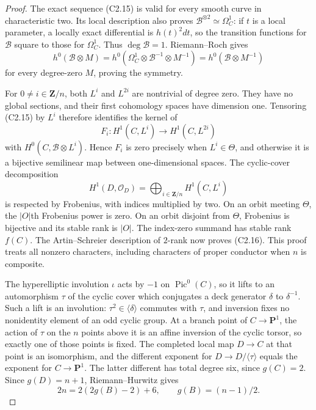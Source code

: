 \begin{proof}
The exact sequence (C2.15) is valid for every smooth curve in
characteristic two. Its local description also proves
$\mathcal B^{\otimes2}\simeq\Omega_C^1$: if $t$ is a local
parameter, a locally exact differential is $h(t)^2dt$, so the
transition functions for $\mathcal B$ square to those for
$\Omega_C^1$. Thus $\deg\mathcal B=1$. Riemann--Roch gives
\[
 h^0(\mathcal B\otimes M)
   =h^0(\Omega_C^1\otimes\mathcal B^{-1}\otimes M^{-1})
   =h^0(\mathcal B\otimes M^{-1})
\]
for every degree-zero $M$, proving the symmetry.

For $0\ne i\in\mathbf Z/n$, both $L^i$ and $L^{2i}$ are
nontrivial of degree zero. They have no global sections, and
their first cohomology spaces have dimension one. Tensoring
(C2.15) by $L^i$ therefore identifies the kernel of
\[
 F_i:H^1(C,L^i)\longrightarrow H^1(C,L^{2i})
\]
with $H^0(C,\mathcal B\otimes L^i)$. Hence $F_i$ is zero
precisely when $L^i\in\Theta$, and otherwise it is a bijective
semilinear map between one-dimensional spaces. The cyclic-cover
decomposition
\[
 H^1(D,\mathcal O_D)=
             \bigoplus_{i\in\mathbf Z/n}H^1(C,L^i)
\]
is respected by Frobenius, with indices multiplied by two.
On an orbit meeting $\Theta$, the $|O|$th Frobenius power is
zero. On an orbit disjoint from $\Theta$, Frobenius is bijective
and its stable rank is $|O|$. The index-zero summand has stable
rank $f(C)$. The Artin--Schreier description of $2$-rank now
proves (C2.16). This proof treats all nonzero characters,
including characters of proper conductor when $n$ is composite.

The hyperelliptic involution $\iota$ acts by $-1$ on
$\operatorname{Pic}^0(C)$, so it lifts to an automorphism
$\tau$ of the cyclic cover which conjugates a deck generator
$\delta$ to $\delta^{-1}$. Such a lift is an involution:
$\tau^2\in\langle\delta\rangle$ commutes with $\tau$, and
inversion fixes no nonidentity element of an odd cyclic group.
At a branch point of $C\to\mathbf P^1$, the action of $\tau$
on the $n$ points above it is an affine inversion of the cyclic
torsor, so exactly one of those points is fixed. The completed
local map $D\to C$ at that point is an isomorphism, and the
different exponent for $D\to D/\langle\tau\rangle$ equals
the exponent for $C\to\mathbf P^1$. The latter different has
total degree six, since $g(C)=2$. Since $g(D)=n+1$,
Riemann--Hurwitz gives
\[
       2n=2(2g(B)-2)+6,\qquad g(B)=(n-1)/2.
\]


\end{proof}
